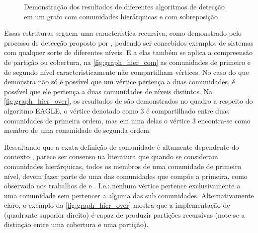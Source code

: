 \documentclass[notes.tex]{subfiles}
\begin{document}
\begin{figure}[htpb]
    \centering
    \caption{Demonstração dos resultados de diferentes algoritmos de detecção em um grafo com comunidades hierárquicas e com sobreposição}\label{fig:graph_hier_over}
\end{figure}

Essas estruturas seguem uma característica recursiva, como demonstrado pelo processo de detecção proposto por , podendo ser concebidos exemplos de sistemas com qualquer sorte de diferentes níveis.
E a elas também se aplica a compreensão de partição ou cobertura, na \autoref{fig:graph_hier_com} as comunidades de primeiro e de segundo nível caracteristicamente não compartilham vértices.
No caso do que demonstra  não só é possível que um vértice pertença a duas comunidades, é possível que ele pertença a duas comunidades de níveis distintos.
Na \autoref{fig:graph_hier_over}, os resultados de  são demonstrados no quadro a respeito do algoritmo EAGLE, o vértice denotado como 3 é compartilhado entre duas comunidades de primeira ordem, mas em uma delas o vértice 3 encontra-se como membro de uma comunidade de segunda ordem.

Ressaltando que a exata definição de comunidade é altamente dependente do contexto \cite{fortunato2010community}, parece ser consenso na literatura que quando se consideram comunidades hierárquicas, todos os membros de uma comunidade de primeiro nível, devem fazer parte de uma das comunidades que compõe a primeira, como observado nos trabalhos de  e .
I.e.: nenhum vértice pertence exclusivamente a uma comunidade sem pertencer a alguma das sub comunidades.
Alternativamente claro, o exemplo da \autoref{fig:graph_hier_over} mostra que a implementação de  (quadrante superior direito) é capaz de produzir partições recursivas (note-se a distinção entre uma cobertura e uma partição).
\end{document}

